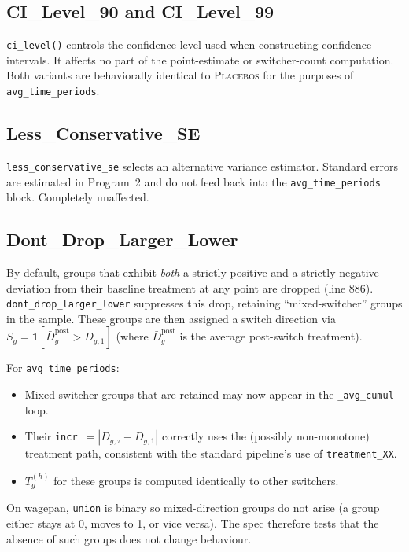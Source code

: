 \documentclass[11pt]{article}
\begin{document}
\subsection{CI\_Level\_90 and CI\_Level\_99}

\texttt{ci\_level()} controls the confidence level used when constructing
confidence intervals. It affects no part of the point-estimate or switcher-count
computation. Both variants are behaviorally identical to \textsc{Placebos} for
the purposes of \texttt{avg\_time\_periods}.

\subsection{Less\_Conservative\_SE}

\texttt{less\_conservative\_se} selects an alternative variance estimator.
Standard errors are estimated in Program~2 and do not feed back into the
\texttt{avg\_time\_periods} block. Completely unaffected.

\subsection{Dont\_Drop\_Larger\_Lower}

By default, groups that exhibit \emph{both} a strictly positive and a strictly
negative deviation from their baseline treatment at any point are dropped (line
886). \texttt{dont\_drop\_larger\_lower} suppresses this drop, retaining
``mixed-switcher'' groups in the sample. These groups are then assigned a
switch direction via $S_g = \mathbf{1}[\bar{D}_g^{\text{post}} > D_{g,1}]$
(where $\bar{D}_g^{\text{post}}$ is the average post-switch treatment).

For \texttt{avg\_time\_periods}:
\begin{itemize}[nosep]
  \item Mixed-switcher groups that are retained may now appear in the
        \texttt{\_avg\_cumul} loop.
  \item Their \texttt{incr}~$= |D_{g,\tau} - D_{g,1}|$ correctly uses the
        (possibly non-monotone) treatment path, consistent with the standard
        pipeline's use of \texttt{treatment\_XX}.
  \item $T_g^{(h)}$ for these groups is computed identically to other
        switchers.
\end{itemize}

On wagepan, \texttt{union} is binary so mixed-direction groups do not arise
(a group either stays at 0, moves to 1, or vice versa). The spec therefore
tests that the absence of such groups does not change behaviour.
\end{document}
